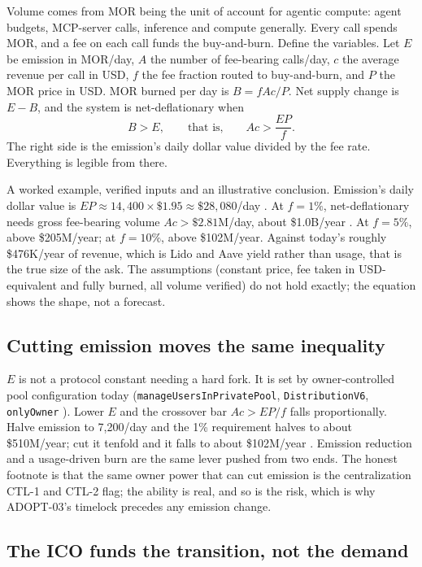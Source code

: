 \documentclass[11pt,a4paper]{article}
\newcommand{\code}[1]{\texttt{\small #1}}
\newcommand{\prov}[1]{{\color{muted}\footnotesize\sffamily[#1]}}
\begin{document}
Volume comes from MOR being the unit of account for agentic compute: agent budgets, MCP-server
calls, inference and compute generally. Every call spends MOR, and a fee on each call funds the
buy-and-burn. Define the variables. Let $E$ be emission in MOR/day, $A$ the number of
fee-bearing calls/day, $c$ the average revenue per call in USD, $f$ the fee fraction routed to
buy-and-burn, and $P$ the MOR price in USD. MOR burned per day is $B = fAc/P$. Net supply change
is $E - B$, and the system is net-deflationary when
\[
  B > E, \qquad\text{that is,}\qquad Ac > \frac{EP}{f}.
\]
The right side is the emission's daily dollar value divided by the fee rate. Everything is
legible from there.

A worked example, verified inputs and an illustrative conclusion. Emission's daily dollar value
is $EP \approx 14{,}400 \times \$1.95 \approx \$28{,}080$/day \prov{derived}. At $f = 1\%$,
net-deflationary needs gross fee-bearing volume $Ac > \$2.81$M/day, about \$1.0B/year
\prov{illustrative}. At $f = 5\%$, above \$205M/year; at $f = 10\%$, above \$102M/year. Against
today's roughly \$476K/year of revenue, which is Lido and Aave yield rather than usage, that is
the true size of the ask. The assumptions (constant price, fee taken in USD-equivalent and
fully burned, all volume verified) do not hold exactly; the equation shows the shape, not a
forecast.

\subsection{Cutting emission moves the same inequality}

$E$ is not a protocol constant needing a hard fork. It is set by owner-controlled pool
configuration today (\code{manageUsersInPrivatePool}, \code{DistributionV6}, \code{onlyOwner}
\prov{verified}). Lower $E$ and the crossover bar $Ac > EP/f$ falls proportionally. Halve
emission to 7,200/day and the 1\% requirement halves to about \$510M/year; cut it tenfold and it
falls to about \$102M/year \prov{illustrative}. Emission reduction and a usage-driven burn are
the same lever pushed from two ends. The honest footnote is that the same owner power that can
cut emission is the centralization CTL-1 and CTL-2 flag; the ability is real, and so is the
risk, which is why ADOPT-03's timelock precedes any emission change.

\subsection{The ICO funds the transition, not the demand}
\end{document}
